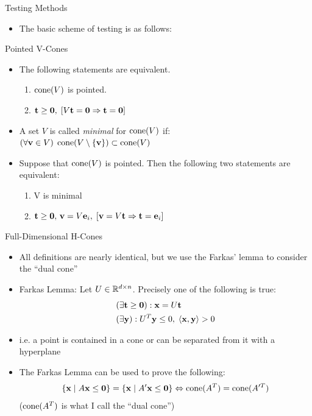 \documentclass{beamer}
\begin{document}
\begin{frame}{Testing Methods}
\begin{itemize}
  \item The basic scheme of testing is as follows:
\end{itemize}
\end{frame}

\begin{frame}{Pointed V-Cones}
\begin{itemize}
  \item The following statements are equivalent.
    \begin{enumerate}
      \item $\operatorname{cone}(V)$ is pointed.
      \item $\mathbf{t}\geq\mathbf{0},\; [V\mathbf{t}=\mathbf{0} \Rightarrow \mathbf{t}=\mathbf{0}]$
    \end{enumerate}

  \item A set $V$ is called \textit{minimal} for $\operatorname{cone}(V)$ if:\\
  $(\forall \mathbf{v} \in V)\; \operatorname{cone}(V\setminus\{\mathbf{v}\}) \subset \operatorname{cone}(V)$

	\item Suppose that $\operatorname{cone}(V)$ is pointed.  Then the following two statements are equivalent:
	\begin{enumerate}
		\item V is minimal
		\item $\mathbf{t}\geq\mathbf{0},\,\mathbf{v}=V\mathbf{e}_i,\; [\mathbf{v}=V\mathbf{t} \Rightarrow \mathbf{t}=\mathbf{e}_i]$
	\end{enumerate}
\end{itemize}
\end{frame}

\begin{frame}{Full-Dimensional H-Cones}
\begin{itemize}
  \item All definitions are nearly identical, but we use the Farkas' lemma to consider the ``dual cone''
  \item Farkas Lemma:
    Let $U \in \mathbb{R}^{d\times n}$.  Precisely one of the following is true:
    \begin{align*}
       & (\exists \mathbf{t} \geq \mathbf{0}) : \mathbf{x} = U\mathbf{t}                \\
       & (\exists \mathbf{y}) : U^T\mathbf{y} \leq 0,\; \left\langle \mathbf{x}, \mathbf{y} \right\rangle > 0
    \end{align*}
  \item i.e. a point is contained in a cone or can be separated from it with a hyperplane
  \item The Farkas Lemma can be used to prove the following: 
    \[\left\{\mathbf{x}\;|\; A\mathbf{x}\leq\mathbf{0}\right\} = \left\{\mathbf{x}\;|\; A'\mathbf{x}\leq\mathbf{0}\right\} \Leftrightarrow \operatorname{cone}(A^T) = \operatorname{cone}(A'^T)\]
    ($\operatorname{cone}(A^T)$ is what I call the ``dual cone'')
\end{itemize}
\end{frame}
\end{document}
